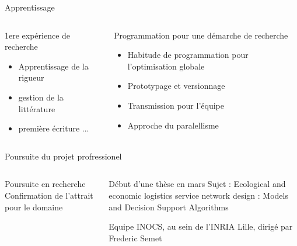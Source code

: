 \begin{frame}{Apprentissage}
    \begin{columns}
        \begin{column}{0.45\textwidth}
            \begin{block}{1ere expérience de recherche}
                \begin{itemize}
                    \item Apprentissage de la rigueur
                    \item gestion de la littérature
                    \item première écriture ...
                \end{itemize}
                
            \end{block}
        \end{column}
        \begin{column}{0.45\textwidth}
            \begin{block}{Programmation pour une démarche de recherche}

                \begin{itemize}
                    \item Habitude de programmation pour l'optimisation globale
                    \item Prototypage et versionnage
                    \item Transmission pour l'équipe
                    \item Approche du paralellisme
                \end{itemize}
            \end{block}       
        \end{column}
    \end{columns}
\end{frame}

\begin{frame}{Poursuite du projet profressionel}
    \begin{columns}
        \begin{column}{0.45\textwidth}
            \begin{block}{Poursuite en recherche}
                Confirmation de l'attrait pour le domaine
                
            \end{block}
        \end{column}
        \begin{column}{0.45\textwidth}
            \begin{block}{Début d'une thèse en mars}
                    Sujet : Ecological and economic logistics service network design : Models and Decision Support Algorithms

                    Equipe INOCS, au sein de l'INRIA Lille, dirigé par Frederic Semet
                
            \end{block}   
        \end{column}
    \end{columns}
\end{frame}